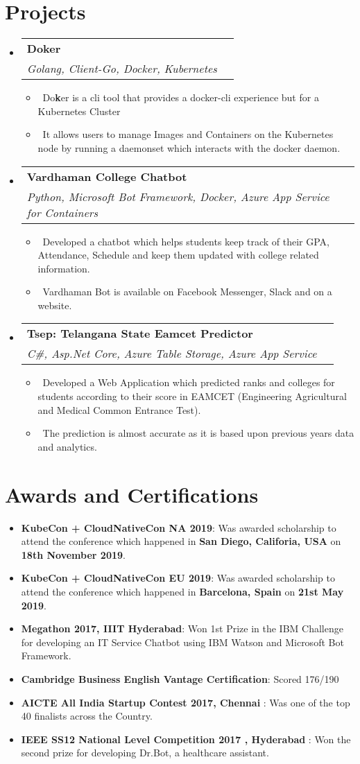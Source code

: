 \documentclass[letterpaper,11pt]{article}
\makeatletter
\newcommand{\resumeItem}[2]{
  \item\small{
    \textbf{#1}{: #2 \vspace{-2pt}}
  }
}
\newcommand{\resumeMyItem}[1]{
  \item\small{
    \ #1 \vspace{-2pt}
  }
}
\newcommand{\resumeSubheading}[4]{
  \vspace{-1pt}\item
    \begin{tabular*}{0.97\textwidth}{l@{\extracolsep{\fill}}r}
      \textbf{#1} & #2 \\
      \textit{\small#3} & \textit{\small #4} \\
    \end{tabular*}\vspace{-5pt}
}
\newcommand{\resumeSubItem}[2]{\resumeItem{#1}{#2}\vspace{-4pt}}
\newcommand{\resumeSubHeadingListStart}{\begin{itemize}[leftmargin=*]}
\newcommand{\resumeSubHeadingListEnd}{\end{itemize}}
\newcommand{\resumeItemListStart}{\begin{itemize}}
\newcommand{\resumeItemListEnd}{\end{itemize}\vspace{-5pt}}
\makeatother
\begin{document}
\section{Projects}
  \resumeSubHeadingListStart

  \resumeSubheading
  {Doker}{}
  {Golang, Client-Go, Docker, Kubernetes}{}
  \resumeItemListStart
    \resumeMyItem{Do\textbf{k}er is a cli tool that provides a docker-cli experience but for a Kubernetes Cluster}
    \resumeMyItem{It allows users to manage Images and Containers on the Kubernetes node by running a daemonset which interacts with the docker daemon.}
  \resumeItemListEnd

  \resumeSubheading
  {Vardhaman College Chatbot}{}
  {Python, Microsoft Bot Framework, Docker, Azure App Service for Containers}{}
  \resumeItemListStart
    \resumeMyItem{Developed a chatbot which helps students keep track of their GPA, Attendance, Schedule and keep them updated with college related information.}
    \resumeMyItem{Vardhaman Bot is available on Facebook Messenger, Slack and on a website.}
  \resumeItemListEnd

    \resumeSubheading
      {Tsep: Telangana State Eamcet Predictor}{}
      {C\#, Asp.Net Core, Azure Table Storage, Azure App Service}{}
      \resumeItemListStart
        \resumeMyItem{Developed a Web Application which predicted ranks and colleges for students according to their score in EAMCET (Engineering Agricultural and Medical Common Entrance Test).}
        \resumeMyItem{The prediction is almost accurate as it is based upon previous years data and analytics.}
      \resumeItemListEnd
    \resumeSubHeadingListEnd
\section{Awards and Certifications}
  \resumeSubHeadingListStart
  \resumeSubItem{KubeCon + CloudNativeCon NA 2019}{Was awarded scholarship to attend the conference which happened in \textbf{San Diego, Califoria, USA} on \textbf{18th November 2019}.}
    \resumeSubItem{KubeCon + CloudNativeCon EU 2019}{Was awarded scholarship to attend the conference which happened in \textbf{Barcelona, Spain} on \textbf{21st May 2019}.}
    \resumeSubItem{Megathon 2017, IIIT Hyderabad}
      {Won 1st Prize in the IBM Challenge for developing an IT Service Chatbot using IBM Watson and Microsoft Bot Framework.}
      \resumeSubItem{Cambridge Business English Vantage Certification}
      {Scored  176/190 }
      \resumeSubItem{AICTE All India Startup Contest 2017, Chennai }
      {Was one of the top 40 finalists across the Country.}
      \resumeSubItem{IEEE SS12 National Level Competition 2017 , Hyderabad }
      {Won the second prize for developing Dr.Bot, a healthcare assistant.}
  \resumeSubHeadingListEnd
\end{document}
